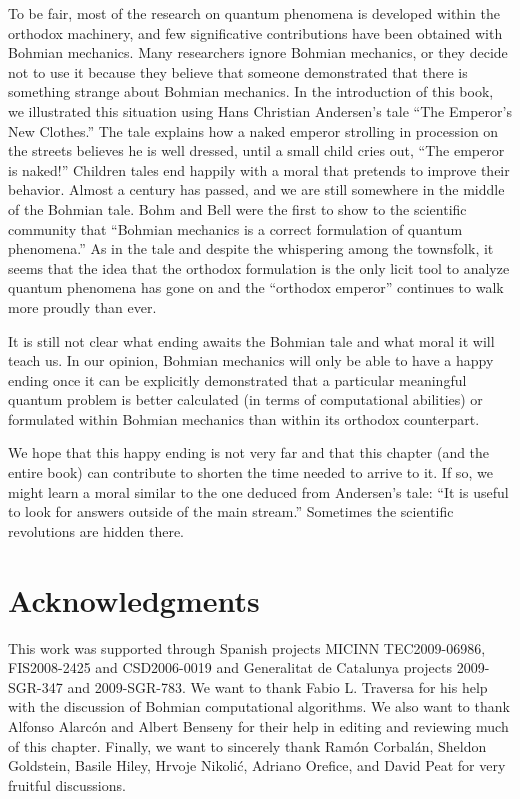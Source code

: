 \documentclass[onecolumn,nofootinbib, secnumarabic, amsmath, nobibnotes,12pt,aps,pra]{revtex4-1}
\begin{document}
To be fair, most of the research on quantum phenomena is developed
within the orthodox machinery, and few significative contributions
have been obtained with Bohmian mechanics. Many researchers ignore
Bohmian mechanics, or they decide not to use it because they believe
that someone demonstrated that there is something strange about
Bohmian mechanics. In the introduction of this book, we illustrated
this situation using Hans Christian Andersen's tale ``The Emperor's
New Clothes.'' The tale explains how a naked emperor strolling in
procession on the streets believes he is well dressed, until a small
child cries out, ``The emperor is naked!'' Children tales end
happily with a moral that pretends to improve their behavior. Almost
a century has passed, and we are still somewhere in the middle of
the Bohmian tale. Bohm and Bell were the first to show to the
scientific community that ``Bohmian mechanics is a correct
formulation of quantum phenomena.'' As in the tale and despite the
whispering among the townsfolk, it seems that the idea that the
orthodox formulation is the only licit tool to analyze quantum
phenomena has gone on and the ``orthodox emperor'' continues to walk
more proudly than ever.

It is still not clear what ending awaits the Bohmian tale and what
moral it will teach us. In our opinion, Bohmian mechanics will only
be able to have a happy ending once it can be explicitly
demonstrated that a particular  meaningful quantum problem is better calculated
(in terms of computational abilities) or formulated within Bohmian
mechanics than within its orthodox counterpart.

We hope that this happy ending is not very far and that this chapter (and the entire book) can contribute to shorten the time needed to arrive to it. If so, we might learn a moral similar to the one deduced from Andersen's tale: ``It is useful to look for answers outside of the main stream.'' Sometimes the scientific revolutions are hidden there.\vspace*{-9pt}\\


\section*{Acknowledgments}

This work was supported through Spanish projects MICINN
TEC2009-06986, FIS2008-2425 and CSD2006-0019 and Generalitat de
Catalunya projects 2009-SGR-347 and 2009-SGR-783. We want to thank
Fabio L. Traversa for his help with the discussion of Bohmian
computational algorithms. We also want to thank Alfonso Alarc\'{o}n and
Albert Benseny for their help in editing and reviewing much of this
chapter. Finally, we want to sincerely thank Ram\'on Corbal\'an,
Sheldon Goldstein, Basile Hiley, Hrvoje Nikoli\'c, Adriano Orefice,
and David Peat for very fruitful discussions.\vspace*{-9pt}\\
\end{document}
